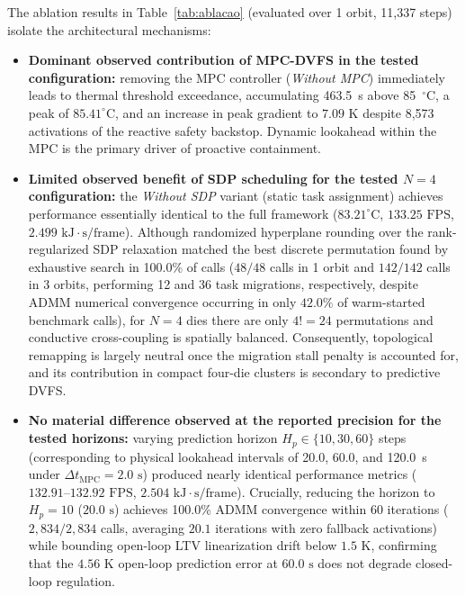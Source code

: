 \documentclass[a4paper,fleqn]{cas-dc}
\begin{document}
The ablation results in Table~\ref{tab:ablacao} (evaluated over 1 orbit, 11,337 steps) isolate the architectural mechanisms:
\begin{itemize}
\item \textbf{Dominant observed contribution of MPC-DVFS in the tested configuration:} removing the MPC controller (\textit{Without MPC}) immediately leads to thermal threshold exceedance, accumulating 463.5~s above 85~$^\circ$C, a peak of $85.41^\circ\text{C}$, and an increase in peak gradient to $7.09\text{ K}$ despite 8,573 activations of the reactive safety backstop. Dynamic lookahead within the MPC is the primary driver of proactive containment.
\item \textbf{Limited observed benefit of SDP scheduling for the tested $N=4$ configuration:} the \textit{Without SDP} variant (static task assignment) achieves performance essentially identical to the full framework ($83.21^\circ\text{C}$, $133.25\text{ FPS}$, $2.499\text{ kJ}\cdot\text{s/frame}$). Although randomized hyperplane rounding over the rank-regularized SDP relaxation matched the best discrete permutation found by exhaustive search in 100.0\% of calls ($48/48$ calls in 1 orbit and $142/142$ calls in 3 orbits, performing 12 and 36 task migrations, respectively, despite ADMM numerical convergence occurring in only $42.0\%$ of warm-started benchmark calls), for $N=4$ dies there are only $4! = 24$ permutations and conductive cross-coupling is spatially balanced. Consequently, topological remapping is largely neutral once the migration stall penalty is accounted for, and its contribution in compact four-die clusters is secondary to predictive DVFS.
\item \textbf{No material difference observed at the reported precision for the tested horizons:} varying prediction horizon $H_p \in \{10, 30, 60\}$ steps (corresponding to physical lookahead intervals of 20.0, 60.0, and 120.0~s under $\Delta t_{\text{MPC}} = 2.0\text{ s}$) produced nearly identical performance metrics ($132.91\text{--}132.92\text{ FPS}$, $2.504\text{ kJ}\cdot\text{s/frame}$). Crucially, reducing the horizon to $H_p=10$ ($20.0\text{ s}$) achieves 100.0\% ADMM convergence within 60 iterations ($2,834/2,834$ calls, averaging $20.1$ iterations with zero fallback activations) while bounding open-loop LTV linearization drift below $1.5\text{ K}$, confirming that the $4.56\text{ K}$ open-loop prediction error at $60.0\text{ s}$ does not degrade closed-loop regulation.
\end{itemize}
\end{document}
